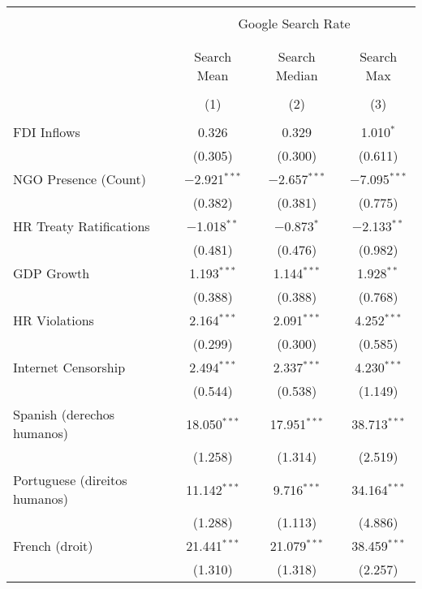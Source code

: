 
\begin{table}[!htbp] \centering 
  \caption{} 
  \label{} 
\begin{tabular}{@{\extracolsep{5pt}}lccc} 
\\[-1.8ex]\hline 
\hline \\[-1.8ex] 
 & \multicolumn{3}{c}{Google Search Rate} \\ 
\cline{2-4} 
\\[-1.8ex] & \multicolumn{3}{c}{ } \\ 
 & Search Mean & Search Median & Search Max \\ 
\\[-1.8ex] & (1) & (2) & (3)\\ 
\hline \\[-1.8ex] 
 FDI Inflows & 0.326 & 0.329 & 1.010$^{*}$ \\ 
  & (0.305) & (0.300) & (0.611) \\ 
  NGO Presence (Count) & $-$2.921$^{***}$ & $-$2.657$^{***}$ & $-$7.095$^{***}$ \\ 
  & (0.382) & (0.381) & (0.775) \\ 
  HR Treaty Ratifications & $-$1.018$^{**}$ & $-$0.873$^{*}$ & $-$2.133$^{**}$ \\ 
  & (0.481) & (0.476) & (0.982) \\ 
  GDP Growth & 1.193$^{***}$ & 1.144$^{***}$ & 1.928$^{**}$ \\ 
  & (0.388) & (0.388) & (0.768) \\ 
  HR Violations & 2.164$^{***}$ & 2.091$^{***}$ & 4.252$^{***}$ \\ 
  & (0.299) & (0.300) & (0.585) \\ 
  Internet Censorship & 2.494$^{***}$ & 2.337$^{***}$ & 4.230$^{***}$ \\ 
  & (0.544) & (0.538) & (1.149) \\ 
  Spanish (derechos humanos) & 18.050$^{***}$ & 17.951$^{***}$ & 38.713$^{***}$ \\ 
  & (1.258) & (1.314) & (2.519) \\ 
  Portuguese (direitos humanos) & 11.142$^{***}$ & 9.716$^{***}$ & 34.164$^{***}$ \\ 
  & (1.288) & (1.113) & (4.886) \\ 
  French (droit) & 21.441$^{***}$ & 21.079$^{***}$ & 38.459$^{***}$ \\ 
  & (1.310) & (1.318) & (2.257) \\ 

\end{tabular}
\end{table}
